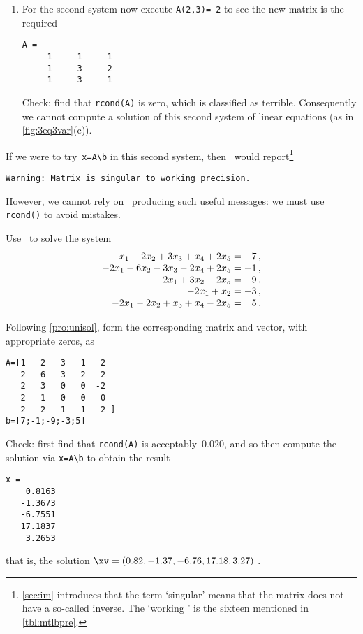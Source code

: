 \begin{example}
\begin{solution}
\begin{enumerate}
\item For the second system now execute \verb|A(2,3)=-2| to see the new matrix is the required
\begin{verbatim}
A =
     1     1    -1
     1     3    -2
     1    -3     1
\end{verbatim}
Check: find that \verb|rcond(A)| is zero, which is classified as terrible.
Consequently we cannot compute a solution of this second system of linear equations (as in \cref{fig:3eq3var}(c)).
\end{enumerate}
If we were to try~\verb|x=A\b| in this second system, then \script\ would report\footnote{\cref{sec:im} introduces that the term `singular' means that the matrix does not have a so-called inverse.  The `working ' is the sixteen  mentioned in \cref{tbl:mtlbpre}.}%
\begin{verbatim}
Warning: Matrix is singular to working precision. 
\end{verbatim}
However, we cannot rely on \script\ producing such useful messages: we must use \verb|rcond()| to avoid mistakes.
\end{solution}
\end{example}



\begin{example} \label{eg:5eqns5vars}
Use \script\ to solve the system
\begin{equation*}
\begin{array}{r@{{}={}}r}
x_1-2x_2+3x_3+x_4+2x_5&7\,,\\
-2x_1-6x_2-3x_3-2x_4+2x_5&-1\,,\\
2x_1+3x_2-2x_5&-9\,,\\
-2x_1+x_2&-3\,,\\
-2x_1-2x_2+x_3+x_4-2x_5&5\,.
\end{array}
\end{equation*}

\begin{solution} 
Following \cref{pro:unisol}, form the corresponding matrix and vector, with appropriate zeros, as
\begin{verbatim}
A=[1  -2   3   1   2
  -2  -6  -3  -2   2
   2   3   0   0  -2
  -2   1   0   0   0
  -2  -2   1   1  -2 ]
b=[7;-1;-9;-3;5]
\end{verbatim}
Check: first find that \verb|rcond(A)| is acceptably~\(0.020\), and so then compute the solution via \verb|x=A\b| to obtain the result
\setbox\ajrqrbox\hbox{}%
\marginajrbox%
\begin{verbatim}
x =
    0.8163
   -1.3673
   -6.7551
   17.1837
    3.2653
\end{verbatim}
that is, the solution \(\xv=(0.82,-1.37,-6.76,17.18,3.27)\) \twodp.
\end{solution}
\end{example}


